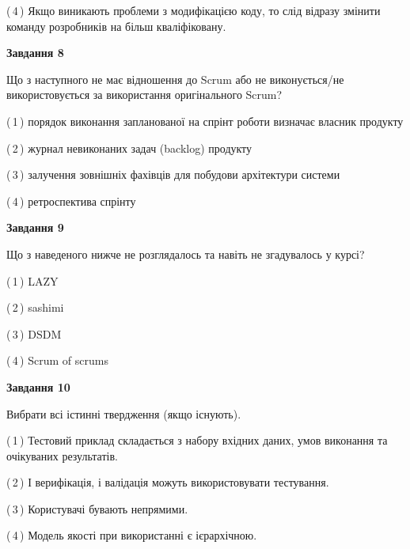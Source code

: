 \documentclass[10pt, ukrainian]{article}
\begin{document}
{\begin {large}
(\,4\,) Якщо виникають проблеми з модифікацією коду, то слід відразу змінити команду розробників на більш кваліфіковану.%


{\begin {center}\textbf{Завдання 8}\end {center}}\par
Що з наступного не має відношення до Scrum або не виконується/не використовується за використання оригінального Scrum?\par
\vspace{2mm}



(\,1\,) порядок виконання запланованої на спрінт роботи визначає власник продукту%



(\,2\,) журнал невиконаних задач (backlog) продукту%



(\,3\,) залучення зовнішніх фахівців для побудови архітектури системи%



(\,4\,) ретроспектива спрінту%


{\begin {center}\textbf{Завдання 9}\end {center}}\par
Що з наведеного нижче не розглядалось та навіть не згадувалось у курсі?\par
\vspace{2mm}



(\,1\,) LAZY%



(\,2\,) sashimi%



(\,3\,) DSDM%



(\,4\,) Scrum of scrums%


{\begin {center}\textbf{Завдання 10}\end {center}}\par
Вибрати всі істинні твердження (якщо існують).\par
\vspace{2mm}



(\,1\,) Тестовий приклад складається з набору вхідних даних, умов виконання та очікуваних результатів.%



(\,2\,) І верифікація, і валідація можуть використовувати тестування.%



(\,3\,) Користувачі бувають непрямими.%



(\,4\,) Модель якості при використанні є ієрархічною.%



\end {large}}
\end{document}
